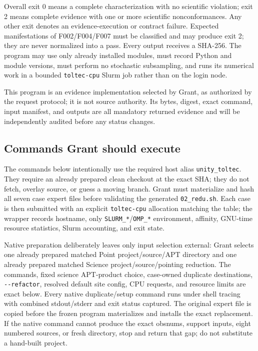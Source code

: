 \documentclass[11pt]{article}
\newcommand{\code}[1]{\nolinkurl{#1}}
\begin{document}
Overall exit 0 means a complete characterization with no scientific violation;
exit 2 means complete evidence with one or more scientific nonconformances.  Any
other exit denotes an evidence-execution or contract failure.  Expected
manifestations of F002/F004/F007 must be classified and may produce exit 2; they
are never normalized into a pass.  Every output receives a SHA-256.  The
program may use only already installed modules, must record Python and module
versions, must perform no stochastic subsampling, and runs its numerical work
in a bounded \code{toltec-cpu} Slurm job rather than on the login node.

This program is an evidence implementation selected by Grant, as authorized by
the request protocol; it is not source authority.  Its bytes, digest, exact
command, input manifest, and outputs are all mandatory returned evidence and
will be independently audited before any status changes.

\subsection*{Commands Grant should execute}

The commands below intentionally use the required host alias
\code{unity_toltec}.  They require an already prepared clean checkout at the
exact SHA; they do not fetch, overlay source, or guess a moving branch.  Grant
must materialize and hash all seven case expert files before validating the
generated \code{02_redu.sh}.  Each case is then submitted with an explicit
\code{toltec-cpu} allocation matching the table; the wrapper records hostname,
only \code{SLURM_*}/\code{OMP_*} environment, affinity, GNU-time resource
statistics, Slurm accounting, and exit state.

Native preparation deliberately leaves only input selection external: Grant
selects one already prepared matched Point project/source/APT directory and one
already prepared matched Science project/source/pointing reduction.  The
commands, fixed science APT-product choice, case-owned duplicate destinations,
\code{--refactor}, resolved default site config, CPU requests, and resource
limits are exact below.  Every native duplicate/setup command runs under shell
tracing with combined stdout/stderr and exit status captured.  The original expert file is copied
before the frozen program materializes and installs the exact replacement.  If
the native command cannot produce the exact obsnums, support inputs, eight
numbered sources, or fresh directory, stop and return that gap; do not
substitute a hand-built project.
\end{document}
